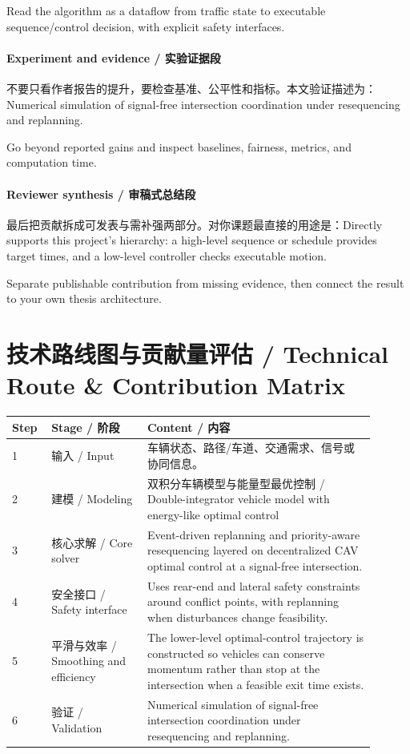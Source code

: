 \documentclass[UTF8,a4paper,11pt,fontset=fandol]{ctexart}
\begin{document}
Read the algorithm as a dataflow from traffic state to executable sequence/control decision, with explicit safety interfaces.

\paragraph{Experiment and evidence / 实验证据段}不要只看作者报告的提升，要检查基准、公平性和指标。本文验证描述为：Numerical simulation of signal-free intersection coordination under resequencing and replanning.

Go beyond reported gains and inspect baselines, fairness, metrics, and computation time.

\paragraph{Reviewer synthesis / 审稿式总结段}最后把贡献拆成可发表与需补强两部分。对你课题最直接的用途是：Directly supports this project's hierarchy: a high-level sequence or schedule provides target times, and a low-level controller checks executable motion.

Separate publishable contribution from missing evidence, then connect the result to your own thesis architecture.


\section{技术路线图与贡献量评估 / Technical Route \& Contribution Matrix}
\begin{longtable}{p{0.08\linewidth}p{0.24\linewidth}p{0.58\linewidth}}
\toprule
Step & Stage / 阶段 & Content / 内容\\
\midrule
1 & 输入 / Input & 车辆状态、路径/车道、交通需求、信号或协同信息。 \\
2 & 建模 / Modeling & 双积分车辆模型与能量型最优控制 / Double-integrator vehicle model with energy-like optimal control \\
3 & 核心求解 / Core solver & Event-driven replanning and priority-aware resequencing layered on decentralized CAV optimal control at a signal-free intersection. \\
4 & 安全接口 / Safety interface & Uses rear-end and lateral safety constraints around conflict points, with replanning when disturbances change feasibility. \\
5 & 平滑与效率 / Smoothing and efficiency & The lower-level optimal-control trajectory is constructed so vehicles can conserve momentum rather than stop at the intersection when a feasible exit time exists. \\
6 & 验证 / Validation & Numerical simulation of signal-free intersection coordination under resequencing and replanning. \\
\bottomrule
\end{longtable}
\end{document}
